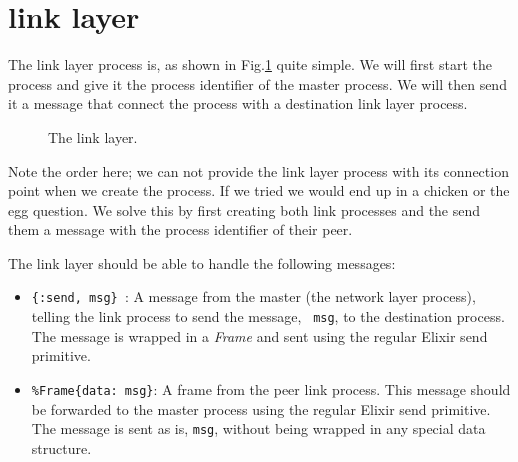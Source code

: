 \documentclass[a4paper,11pt]{article}
\begin{document}
\section{link layer}

The link layer process is, as shown in Fig.\ref{fig:link} quite
simple. We will first start the process and give it the process
identifier of the master process. We will then send it a message that
connect the process with a destination link layer process. 

\begin{figure}
\centering  
{}

\caption{The link layer.}
\label{fig:link}

\end{figure}

Note the order here; we can not provide the link layer process with
its connection point when we create the process. If we tried we would
end up in a chicken or the egg question. We solve this by first
creating both link processes and the send them a message with the process
identifier of their peer.

The link layer should be able to handle the following messages:

\begin{itemize}

\item {\tt \{:send, msg\} }: A message from the master (the network
  layer process), telling the link process to send the message, {\tt
    msg}, to the destination process. The message is wrapped in a {\em
    Frame} and sent using the regular Elixir send primitive.

  \item {\tt \%Frame\{data: msg\}}: A frame from the peer  link
    process. This message should be forwarded to the master process
    using the regular Elixir send primitive. The message is sent as
    is, {\tt msg}, without being wrapped in any special data structure.
\end{itemize}
\end{document}
